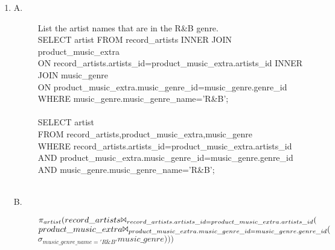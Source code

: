 \documentclass{article}
\begin{document}
\begin{enumerate}
\item
\begin{description}
\item[A.]
\textsf{List the artist names that are in the R\&B genre.\\}
SELECT artist FROM record\_artists INNER JOIN product\_music\_extra\\
ON record\_artists.artists\_id=product\_music\_extra.artists\_id INNER JOIN music\_genre\\
ON product\_music\_extra.music\_genre\_id=music\_genre.genre\_id\\ 
WHERE music\_genre.music\_genre\_name='R\&B';\\
\\
SELECT artist\\
FROM record\_artists,product\_music\_extra,music\_genre\\
WHERE record\_artists.artists\_id=product\_music\_extra.artists\_id\\
AND product\_music\_extra.music\_genre\_id=music\_genre.genre\_id\\
AND music\_genre.music\_genre\_name='R\&B';\\
\\
\item[B.]
$\pi_{artist}(record\_artists \Bowtie_{record\_artists.artists\_id=product\_music\_extra.artists\_id} ($\\
$product\_music\_extra \Bowtie_{product\_music\_extra.music\_genre\_id=music\_genre.genre\_id} ($\\
$\sigma_{music\_genre\_name='R\&B'}music\_genre)))$\\
\end{description}


\end{enumerate}
\end{document}
